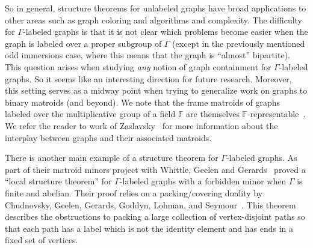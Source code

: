 \documentclass[11pt]{article}
\theoremstyle{definition}
\newcommand{\RM}[1]{\todo[linecolor=red,bordercolor=white,color=DeepCarrotOrange,backgroundcolor=BananaYellow!40,textcolor=DeepCarrotOrange,size=\footnotesize]{\textsf{RM: #1}}}
\newcommand{\CM}[1]{\todo[linecolor=red,bordercolor=white,color=Magenta,backgroundcolor=CornflowerBlue!40,textcolor=black,size=\footnotesize]{\textsf{CM: #1}}}
\begin{document}

So in general, structure theorems for unlabeled graphs have broad applications to other areas such as graph coloring and algorithms and complexity. The difficulty for $\Gamma$-labeled graphs is that it is not clear which problems become easier when the graph is labeled over a proper subgroup of $\Gamma$ (except in the previously mentioned odd immersions case, where this means that the graph is ``almost'' bipartite). This question arises when studying \emph{any} notion of graph containment for $\Gamma$-labeled graphs. So it seems like an interesting direction for future research. Moreover, this setting serves as a midway point when trying to generalize work on graphs to binary matroids (and beyond). We note that the frame matroids of graphs labeled over the multiplicative group of a field $\mathbb{F}$ are themselves $\mathbb{F}$-representable~\cite{Zaslavsky03}. We refer the reader to work of Zaslavsky~\cite{zaslavskyI, Zaslavsky94} for more information about the interplay between graphs and their associated matroids.


There is another main example of a structure theorem for $\Gamma$-labeled graphs. As part of their matroid minors project with Whittle, Geelen and Gerards~\cite{GeelenGerardsGroupLabeled} proved a ``local structure theorem'' for $\Gamma$-labeled graphs with a forbidden minor when $\Gamma$ is finite and abelian. Their proof relies on a packing/covering duality by Chudnovsky, Geelen, Gerards, Goddyn, Lohman, and Seymour~\cite{chudnovsky2006packing}. This theorem describes the obstructions to packing a large collection of vertex-disjoint paths so that each path has a label which is not the identity element and has ends in a fixed set of vertices.
\end{document}

